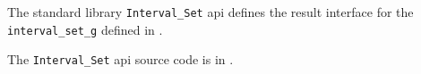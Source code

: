 
The standard library {\tt Interval\_Set} api defines the result interface for the 
{\tt interval\_set\_g} defined in .

The {\tt Interval\_Set} api source code is in .






